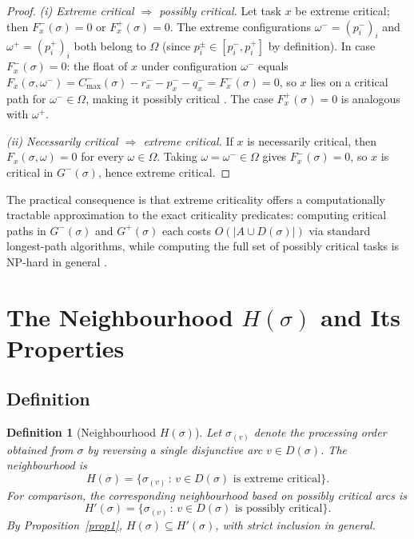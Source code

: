\documentclass[preprint,12pt]{elsarticle}
\newtheorem{definition}{Definition}
\begin{document}
\begin{proof}
\textit{(i) Extreme critical $\Rightarrow$ possibly critical.}
Let task $x$ be extreme critical; then $F_x^-(\sigma)=0$ or $F_x^+(\sigma)=0$.
The extreme configurations $\omega^- = (p_i^-)_{i}$ and $\omega^+ = (p_i^+)_{i}$ both belong to $\Omega$
(since $p_i^{\pm}\in[p_i^-,p_i^+]$ by definition).
In case $F_x^-(\sigma)=0$: the float of $x$ under configuration $\omega^-$ equals
$F_x(\sigma,\omega^-)=C^-_{\max}(\sigma)-r_x^- - p_x^- - q_x^- = F_x^-(\sigma)=0$,
so $x$ lies on a critical path for $\omega^-\in\Omega$, making it possibly critical \cite{Fortin2010,Artigues2015}.
The case $F_x^+(\sigma)=0$ is analogous with $\omega^+$.

\textit{(ii) Necessarily critical $\Rightarrow$ extreme critical.}
If $x$ is necessarily critical, then $F_x(\sigma,\omega)=0$ for every $\omega\in\Omega$.
Taking $\omega=\omega^-\in\Omega$ gives $F_x^-(\sigma)=0$, so $x$ is critical in $G^-(\sigma)$, hence extreme critical.
\end{proof}

\medskip

The practical consequence is that extreme criticality offers a computationally tractable approximation to the exact criticality predicates: computing critical paths in $G^-(\sigma)$ and $G^+(\sigma)$ each costs $O(|A \cup D(\sigma)|)$ via standard longest-path algorithms, while computing the full set of possibly critical tasks is NP-hard in general \cite{Fortin2010,Artigues2015}.


\section{The Neighbourhood $H(\sigma)$ and Its Properties}
\label{sec4}

\subsection{Definition}
\label{sec4.1}

\begin{definition}[Neighbourhood $H(\sigma)$]
\label{def2}
Let $\sigma_{(v)}$ denote the processing order obtained from $\sigma$ by reversing a single disjunctive arc $v \in D(\sigma)$. The neighbourhood is
\begin{equation}
H(\sigma) = \{ \sigma_{(v)} \,:\, v \in D(\sigma) \text{ is extreme critical}\}.
\end{equation}
For comparison, the corresponding neighbourhood based on \emph{possibly} critical arcs is
\begin{equation}
H'(\sigma) = \{ \sigma_{(v)} \,:\, v \in D(\sigma) \text{ is possibly critical}\}.
\end{equation}
By Proposition~\ref{prop1}, $H(\sigma) \subseteq H'(\sigma)$, with strict inclusion in general.
\end{definition}
\end{document}
